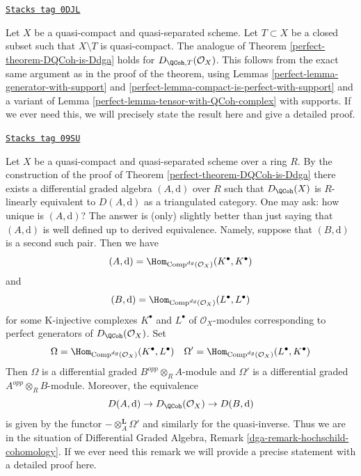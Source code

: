 \begin{remark}

\label{perfect-remark-DQCoh-is-Ddga-with-support}
\href{https://stacks.math.columbia.edu/tag/0DJL}{\texttt{Stacks tag 0DJL}}

Let $X$ be a quasi-compact and quasi-separated scheme. Let $T \subset X$
be a closed subset such that $X \setminus T$ is quasi-compact.
The analogue of Theorem \ref{perfect-theorem-DQCoh-is-Ddga} holds
for $D_{\QCoh, T}(\mathcal{O}_X)$.
This follows from the exact same argument as in the proof
of the theorem, using
Lemmas \ref{perfect-lemma-generator-with-support} and
\ref{perfect-lemma-compact-is-perfect-with-support}
and a variant of Lemma \ref{perfect-lemma-tensor-with-QCoh-complex}
with supports.
If we ever need this, we will precisely state the
result here and give a detailed proof.
\end{remark}

\begin{remark}

\label{perfect-remark-independence-choice}
\href{https://stacks.math.columbia.edu/tag/09SU}{\texttt{Stacks tag 09SU}}

Let $X$ be a quasi-compact and quasi-separated scheme over a ring $R$.
By the construction of the proof of
Theorem \ref{perfect-theorem-DQCoh-is-Ddga}
there exists a differential graded algebra $(A, \text{d})$ over $R$
such that $D_\QCoh(X)$ is $R$-linearly equivalent to
$D(A, \text{d})$ as a triangulated category.
One may ask: how unique is $(A, \text{d})$?
The answer is (only) slightly better than just saying that
$(A, \text{d})$ is well defined up to derived equivalence.
Namely, suppose that $(B, \text{d})$ is a second such pair.
Then we have
$$
(A, \text{d}) = \Hom_{\text{Comp}^{dg}(\mathcal{O}_X)}(K^\bullet, K^\bullet)
$$
and
$$
(B, \text{d}) = \Hom_{\text{Comp}^{dg}(\mathcal{O}_X)}(L^\bullet, L^\bullet)
$$
for some K-injective complexes $K^\bullet$ and $L^\bullet$
of $\mathcal{O}_X$-modules corresponding to perfect generators
of $D_\QCoh(\mathcal{O}_X)$. Set
$$
\Omega = \Hom_{\text{Comp}^{dg}(\mathcal{O}_X)}(K^\bullet, L^\bullet)
\quad
\Omega' = \Hom_{\text{Comp}^{dg}(\mathcal{O}_X)}(L^\bullet, K^\bullet)
$$
Then $\Omega$ is a differential graded $B^{opp} \otimes_R A$-module
and $\Omega'$ is a differential graded $A^{opp} \otimes_R B$-module.
Moreover, the equivalence
$$
D(A, \text{d}) \to D_\QCoh(\mathcal{O}_X) \to
D(B, \text{d})
$$
is given by the functor $- \otimes_A^\mathbf{L} \Omega'$ and
similarly for the quasi-inverse. Thus we are in the situation
of Differential Graded Algebra, Remark \ref{dga-remark-hochschild-cohomology}.
If we ever need this remark we will provide a precise statement
with a detailed proof here.
\end{remark}

